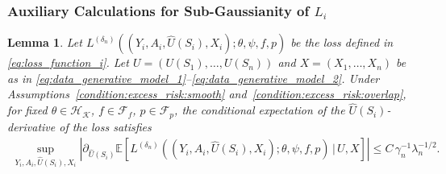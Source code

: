 \documentclass[12pt]{article}
\newtheorem{lemma}{Lemma}%
\newcommand{\E}{\mathbb{E}}
\begin{document}
\subsubsection{Auxiliary Calculations for Sub-Gaussianity of $L_i$}

\begin{lemma}\label{lemma:L_i_derivative_U}
    Let $L^{(\delta_n)}((Y_i,A_i,\widehat U(S_i),X_i);\theta,\psi,f,p)$ be the loss defined in \eqref{eq:loss_function_i}.  Let $U=(U(S_1),\ldots,U(S_n))$ and $X=(X_1,\ldots,X_n)$ be as in \eqref{eq:data_generative_model_1}--\eqref{eq:data_generative_model_2}.  Under Assumptions~\ref{condition:excess_risk:smooth} and~\ref{condition:excess_risk:overlap}, for fixed $\theta\in\mathcal{H}_\mathcal{K}$, $f\in\mathcal{F}_f$, $p\in\mathcal{F}_p$, the conditional expectation of the $\widehat{U}(S_i)$-derivative of the loss satisfies
    \begin{align*}
        \sup_{Y_i,A_i,\widehat U(S_i),X_i}\left|\partial_{\widehat U(S_i)}\E\!\left[L^{(\delta_n)}((Y_i,A_i,\widehat U(S_i),X_i);\theta,\psi,f,p)\,\big|\,U,X\right]\right|
        \leq C\,\gamma_n^{-1}\lambda_n^{-1/2}.
    \end{align*}
\end{lemma}
\end{document}
